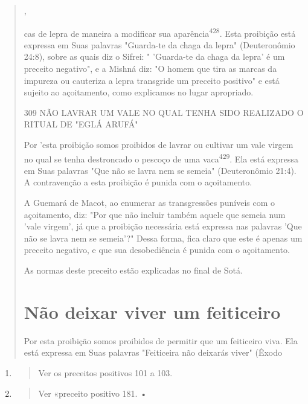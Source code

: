 \begin{quote}
,

cas de lepra de maneira a modificar sua aparência\textsuperscript{428}.
Esta proibição está ex­pressa em Suas palavras "Guarda-te da chaga da
lepra" (Deuteronômio 24:8), sobre as quais diz o Sifrei: " 'Guarda-te da
chaga da lepra' é um preceito negati­vo", e a Mishná diz: "O homem que
tira as marcas da impureza ou cauteriza a lepra transgride um preceito
positivo" e está sujeito ao açoitamento, como explicamos no lugar
apropriado.

309 NÃO LAVRAR UM VALE NO QUAL TENHA SIDO REALIZADO O RITUAL DE "EGLÁ
ARUFÁ"

Por 'esta proibição somos proibidos de lavrar ou cultivar um vale
vir­gem no qual se tenha destroncado o pescoço de uma
vaca\textsuperscript{429}. Ela está expres­sa em Suas palavras "Que não
se lavra nem se semeia" (Deuteronômio 21:4). A contravenção a esta
proibição é punida com o açoitamento.

A Guemará de Macot, ao enumerar as transgressões puníveis com o
açoitamento, diz: "Por que não incluir também aquele que semeia num
'vale virgem', já que a proibição necessária está expressa nas palavras
'Que não se lavra nem se semeia'?" Dessa forma, fica claro que este é
apenas um preceito negativo, e que sua desobediência é punida com o
açoitamento.

As normas deste preceito estão explicadas no final de Sotá.

\section{Não deixar viver um feiticeiro}

Por esta proibição somos proibidos de permitir que um feiticeiro vi­va.
Ela está expressa em Suas palavras "Feiticeira não deixarás viver"
(Êxodo
\end{quote}

\begin{enumerate}
\def\labelenumi{\arabic{enumi}.}
\setcounter{enumi}{427}
\item
 \begin{quote}
 Ver os preceitos positivos 101 a 103.
 \end{quote}
\item
 \begin{quote}
 Ver «preceito positivo 181. •
 \end{quote}
\end{enumerate}

